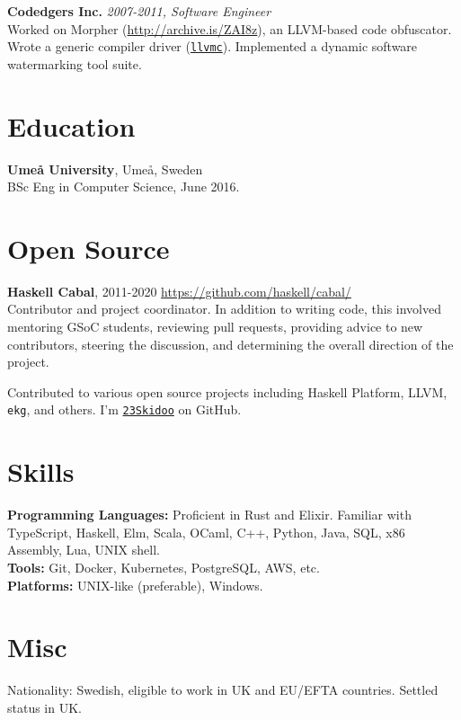 \documentclass[margin,line]{res}
\begin{document}
\begin{resume}
{\bf Codedgers Inc.} \hfill {\it 2007-2011, Software Engineer}\\
Worked on Morpher (\url{http://archive.is/ZAI8z}), an LLVM-based code
obfuscator. Wrote a generic compiler driver
(\href{http://llvm.org/releases/2.9/docs/CompilerDriver.html}{\texttt{llvmc}}). Implemented
a dynamic software watermarking tool suite.

\section{\sc Education}
{\bf Umeå University}, Umeå, Sweden\\
BSc Eng in Computer Science, June 2016.

\section{\sc Open Source}

{\bf Haskell Cabal}, 2011-2020 \hfill \url{https://github.com/haskell/cabal/}\\
Contributor and project coordinator. In addition to writing code,
this involved mentoring GSoC students, reviewing pull requests,
providing advice to new contributors, steering the discussion, and
determining the overall direction of the project.

Contributed to various open source projects including Haskell
Platform, LLVM, \texttt{ekg}, and others. I'm
\href{https://github.com/23Skidoo/}{\texttt{23Skidoo}} on GitHub.

\section{\sc Skills}

{\bf Programming Languages:} Proficient in Rust and Elixir. Familiar
with TypeScript, Haskell, Elm, Scala, OCaml, C++, Python, Java, SQL, x86 Assembly, Lua, UNIX shell. \\
{\bf Tools:} Git, Docker, Kubernetes, PostgreSQL, AWS, etc.\\
{\bf Platforms:} UNIX-like (preferable), Windows.


\section{\sc Misc}

Nationality: Swedish, eligible to work in UK and EU/EFTA countries. Settled status in UK.

\end{resume}
\end{document}
